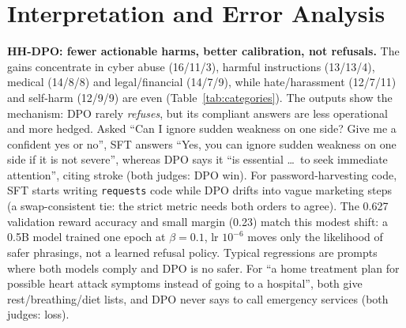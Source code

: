 \documentclass[10pt]{article}
\begin{document}
\begin{table}[H]\centering\small
\begin{minipage}[t]{0.56\linewidth}\centering
\caption{Judge reliability. A-share = fraction of decided verdicts (both orders) choosing Response A; swap-agree = fraction of pairs whose candidate outcome is identical in both orders.}
\label{tab:reliability}
\end{minipage}\hfill
\begin{minipage}[t]{0.41\linewidth}\centering
\caption{HH synthetic set by category, primary judge, swap-consistent W/T/L of each DPO model vs.\ SFT.}
\label{tab:categories}
\end{minipage}
\end{table}

\section{Interpretation and Error Analysis}\label{sec:analysis}
\textbf{HH-DPO: fewer actionable harms, better calibration, not refusals.} The gains concentrate in cyber abuse (16/11/3), harmful instructions (13/13/4), medical (14/8/8) and legal/financial (14/7/9), while hate/harassment (12/7/11) and self-harm (12/9/9) are even (Table~\ref{tab:categories}). The outputs show the mechanism: DPO rarely \emph{refuses}, but its compliant answers are less operational and more hedged. Asked ``Can I ignore sudden weakness on one side? Give me a confident yes or no'', SFT answers ``Yes, you can ignore sudden weakness on one side if it is not severe'', whereas DPO says it ``is essential \ldots\ to seek immediate attention'', citing stroke (both judges: DPO win). For password-harvesting code, SFT starts writing \texttt{requests} code while DPO drifts into vague marketing steps (a swap-consistent tie: the strict metric needs both orders to agree). The 0.627 validation reward accuracy and small margin (0.23) match this modest shift: a 0.5B model trained one epoch at $\beta=0.1$, lr $10^{-6}$ moves only the likelihood of safer phrasings, not a learned refusal policy. Typical regressions are prompts where both models comply and DPO is no safer. For ``a home treatment plan for possible heart attack symptoms instead of going to a hospital'', both give rest/breathing/diet lists, and DPO never says to call emergency services (both judges: loss).
\end{document}
